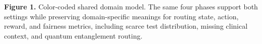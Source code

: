 \documentclass{IEEEtran}
\begin{document}
\begin{center}
{%
}
\par\vspace{0.5em}
\small\textbf{Figure 1.} Color-coded shared domain model. The same four phases support both settings while preserving domain-specific meanings for routing state, action, reward, and fairness metrics, including scarce test distribution, missing clinical context, and quantum entanglement routing.
\label{fig:domain_model}
\end{center}
\end{document}
